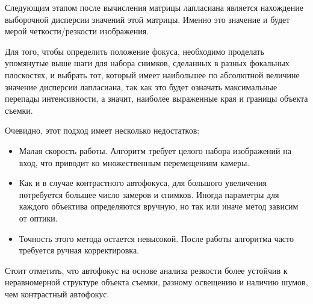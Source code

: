 Следующим этапом после вычисления матрицы лапласиана является нахождение выборочной дисперсии значений этой матрицы. Именно это значение и будет мерой четкости/резкости изображения.

Для того, чтобы определить положение фокуса, необходимо проделать упомянутые выше шаги для набора снимков, сделанных в разных фокальных плоскостях, и выбрать тот, который имеет наибольшее по абсолютной величине значение дисперсии лапласиана, так как это будет означать максимальные перепады интенсивности, а значит, наиболее выраженные края и границы объекта съемки.

Очевидно, этот подход имеет несколько недостатков:
\begin{itemize}
	\item Малая скорость работы. Алгоритм требует целого набора изображений на вход, что приводит ко множественным перемещениям камеры.
	\item Как и в случае контрастного автофокуса, для большого увеличения потребуется большее число замеров и снимков. Иногда параметры для каждого объектива определяются вручную, но так или иначе метод зависим от оптики.
	\item Точность этого метода остается невысокой. После работы алгоритма часто требуется ручная корректировка.
\end{itemize}

Стоит отметить, что автофокус на основе анализа резкости более устойчив к неравномерной структуре объекта съемки, разному освещению и наличию шумов, чем контрастный автофокус.

